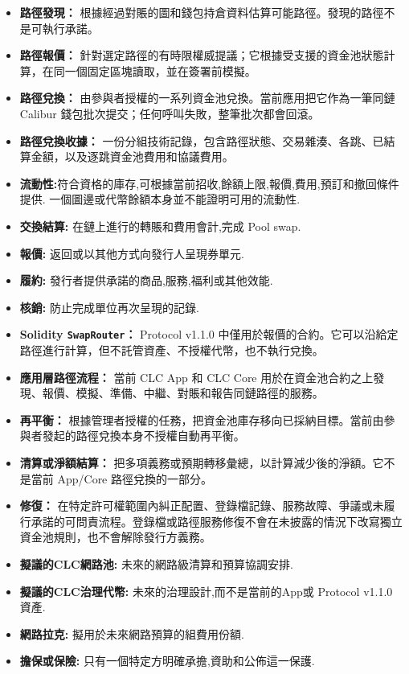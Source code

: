 \documentclass[11pt]{article}
\begin{document}
\begin{itemize}[leftmargin=*]
\item \textbf{路徑發現：} 根據經過對賬的圖和錢包持倉資料估算可能路徑。發現的路徑不是可執行承諾。
\item \textbf{路徑報價：} 針對選定路徑的有時限權威提議；它根據受支援的資金池狀態計算，在同一個固定區塊讀取，並在簽署前模擬。
\item \textbf{路徑兌換：} 由參與者授權的一系列資金池兌換。當前應用把它作為一筆同鏈 Calibur 錢包批次提交；任何呼叫失敗，整筆批次都會回滾。
\item \textbf{路徑兌換收據：} 一份分組技術記錄，包含路徑狀態、交易雜湊、各跳、已結算金額，以及逐跳資金池費用和協議費用。
\item \textbf{流動性:}符合資格的庫存,可根據當前招收,餘額上限,報價,費用,預訂和撤回條件提供. 一個圖邊或代幣餘額本身並不能證明可用的流動性.
\item \textbf{交換結算:} 在鏈上進行的轉賬和費用會計,完成 Pool swap.
\item \textbf{報價:} 返回或以其他方式向發行人呈現券單元.
\item \textbf{履約:} 發行者提供承諾的商品,服務,福利或其他效能.
\item \textbf{核銷:} 防止完成單位再次呈現的記錄.
\item \textbf{Solidity \texttt{SwapRouter}：} Protocol v1.1.0 中僅用於報價的合約。它可以沿給定路徑進行計算，但不託管資產、不授權代幣，也不執行兌換。
\item \textbf{應用層路徑流程：} 當前 CLC App 和 CLC Core 用於在資金池合約之上發現、報價、模擬、準備、中繼、對賬和報告同鏈路徑的服務。
\item \textbf{再平衡：} 根據管理者授權的任務，把資金池庫存移向已採納目標。當前由參與者發起的路徑兌換本身不授權自動再平衡。
\item \textbf{清算或淨額結算：} 把多項義務或預期轉移彙總，以計算減少後的淨額。它不是當前 App/Core 路徑兌換的一部分。
\item \textbf{修復：} 在特定許可權範圍內糾正配置、登錄檔記錄、服務故障、爭議或未履行承諾的可問責流程。登錄檔或路徑服務修復不會在未披露的情況下改寫獨立資金池規則，也不會解除發行方義務。
\item \textbf{擬議的CLC網路池:} 未來的網路級清算和預算協調安排.
\item \textbf{擬議的CLC治理代幣:} 未來的治理設計,而不是當前的App或 Protocol v1.1.0 資產.
\item \textbf{網路拉克:} 擬用於未來網路預算的組費用份額.
\item \textbf{擔保或保險:} 只有一個特定方明確承擔,資助和公佈這一保護.
\end{itemize}
\end{document}
